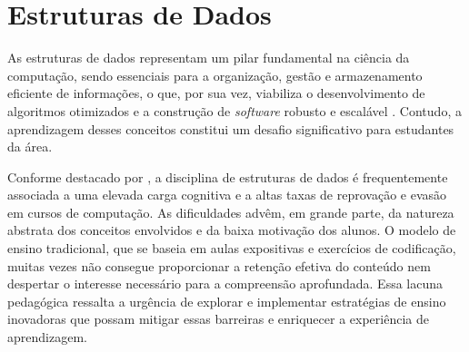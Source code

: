 \section{Estruturas de Dados}

As estruturas de dados representam um pilar fundamental na ciência da
computação, sendo essenciais para a organização, gestão e armazenamento
eficiente de informações, o que, por sua vez, viabiliza o desenvolvimento de
algoritmos otimizados e a construção de \emph{software} robusto e escalável
\cite{cormen2022introduction}. Contudo, a aprendizagem desses conceitos
constitui um desafio significativo para estudantes da área.

Conforme destacado por , a disciplina de
estruturas de dados é frequentemente associada a uma elevada carga cognitiva e
a altas taxas de reprovação e evasão em cursos de computação. As dificuldades
advêm, em grande parte, da natureza abstrata dos conceitos envolvidos e da
baixa motivação dos alunos. O modelo de ensino tradicional, que se baseia em
aulas expositivas e exercícios de codificação, muitas vezes não consegue
proporcionar a retenção efetiva do conteúdo nem despertar o interesse necessário
para a compreensão aprofundada. Essa lacuna pedagógica ressalta a urgência de
explorar e implementar estratégias de ensino inovadoras que possam mitigar
essas barreiras e enriquecer a experiência de aprendizagem.
